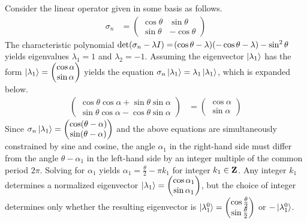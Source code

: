 \begin{answer}
	Consider the linear operator given in some basis as follows.
	\begin{align}
		\sigma_n & =
		\begin{pmatrix}
			\cos \theta & \sin \theta  \\
			\sin \theta & -\cos \theta
		\end{pmatrix}
	\end{align}
	The characteristic polynomial $\det\!\left(\sigma_n - \lambda I\right) = \!\left(\cos \theta - \lambda\right)\!\left(- \cos \theta - \lambda\right) - \sin^2 \theta$ yields eigenvalues $\lambda_1 = 1$ and $\lambda_2 = -1$.
	Assuming the eigenvector $\ket{\lambda_1}$ has the form $\ket{\lambda_1} = \begin{pmatrix} \cos \alpha \\ \sin \alpha \end{pmatrix}$ yields the equation $\sigma_n \ket{\lambda_1} = \lambda_1 \ket{\lambda_1}$, which is expanded below.
	\begin{align}\label{eqn:eigen}
		\begin{pmatrix}
			\cos \theta \cos \alpha + \sin \theta \sin \alpha \\
			\sin \theta \cos \alpha - \cos \theta \sin \alpha
		\end{pmatrix}
		 & =
		\begin{pmatrix}
			\cos \alpha \\
			\sin \alpha
		\end{pmatrix}
	\end{align}
	Since
	$\sigma_n \ket{\lambda_1} =
		\begin{pmatrix}
			\cos\!\left(\theta - \alpha\right) \\
			\sin\!\left(\theta - \alpha\right)
		\end{pmatrix}$ and the above equations are simultaneously constrained by sine and cosine,
	the angle $\alpha_1$ in the right-hand side must differ from the angle $\theta-\alpha_1$ in the left-hand side by an integer multiple of the common period $2 \pi$.
	Solving for $\alpha_1$ yields $\alpha_1 = \frac{\theta}{2} - \pi k_1$ for integer $k_1 \in \mathbf{Z}$.
	Any integer $k_1$ determines a normalized eigenvector $\ket{\lambda_1} = \begin{pmatrix} \cos \alpha_1 \\ \sin \alpha_1 \end{pmatrix}$, but the choice of integer determines only whether the resulting eigenvector is $\ket{\lambda_1^0} = \begin{pmatrix} \cos \frac{\theta}{2} \\ \sin \frac{\theta}{2} \end{pmatrix}$ or $- \ket{\lambda_1^0}$.


\end{answer}
